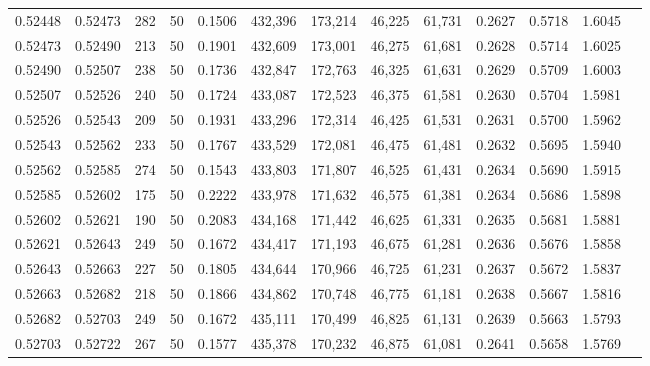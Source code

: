 \begin{tabular}{rrrrrrrrrrrrr}
0.52448 & 0.52473 &   282 &  50 &                                     0.1506 & 432,396 & 173,214 &  46,225 &  61,731 & 0.2627 & 0.5718 & 1.6045 \\
0.52473 & 0.52490 &   213 &  50 &                                     0.1901 & 432,609 & 173,001 &  46,275 &  61,681 & 0.2628 & 0.5714 & 1.6025 \\
0.52490 & 0.52507 &   238 &  50 &                                     0.1736 & 432,847 & 172,763 &  46,325 &  61,631 & 0.2629 & 0.5709 & 1.6003 \\
0.52507 & 0.52526 &   240 &  50 &                                     0.1724 & 433,087 & 172,523 &  46,375 &  61,581 & 0.2630 & 0.5704 & 1.5981 \\
0.52526 & 0.52543 &   209 &  50 &                                     0.1931 & 433,296 & 172,314 &  46,425 &  61,531 & 0.2631 & 0.5700 & 1.5962 \\
0.52543 & 0.52562 &   233 &  50 &                                     0.1767 & 433,529 & 172,081 &  46,475 &  61,481 & 0.2632 & 0.5695 & 1.5940 \\
0.52562 & 0.52585 &   274 &  50 &                                     0.1543 & 433,803 & 171,807 &  46,525 &  61,431 & 0.2634 & 0.5690 & 1.5915 \\
0.52585 & 0.52602 &   175 &  50 &                                     0.2222 & 433,978 & 171,632 &  46,575 &  61,381 & 0.2634 & 0.5686 & 1.5898 \\
0.52602 & 0.52621 &   190 &  50 &                                     0.2083 & 434,168 & 171,442 &  46,625 &  61,331 & 0.2635 & 0.5681 & 1.5881 \\
0.52621 & 0.52643 &   249 &  50 &                                     0.1672 & 434,417 & 171,193 &  46,675 &  61,281 & 0.2636 & 0.5676 & 1.5858 \\
0.52643 & 0.52663 &   227 &  50 &                                     0.1805 & 434,644 & 170,966 &  46,725 &  61,231 & 0.2637 & 0.5672 & 1.5837 \\
0.52663 & 0.52682 &   218 &  50 &                                     0.1866 & 434,862 & 170,748 &  46,775 &  61,181 & 0.2638 & 0.5667 & 1.5816 \\
0.52682 & 0.52703 &   249 &  50 &                                     0.1672 & 435,111 & 170,499 &  46,825 &  61,131 & 0.2639 & 0.5663 & 1.5793 \\
0.52703 & 0.52722 &   267 &  50 &                                     0.1577 & 435,378 & 170,232 &  46,875 &  61,081 & 0.2641 & 0.5658 & 1.5769 \\

\end{tabular}
